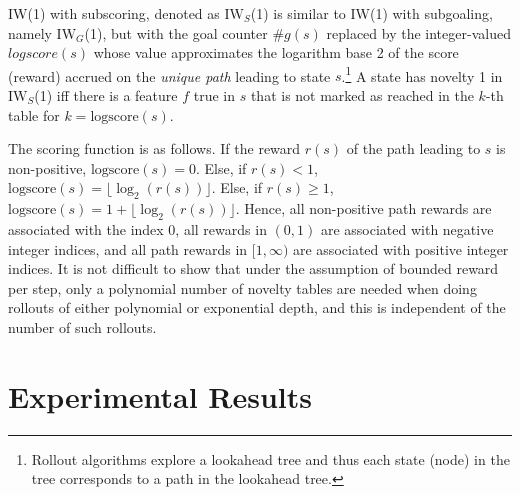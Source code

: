 \documentclass[letterpaper]{article}
\newcommand{\CHECK}[1]{\textcolor{red}{\bf *** #1 ***}}
\begin{document}
IW(1) with subscoring, denoted as $\textrm{IW}_S$(1) is similar to IW(1) with subgoaling,
namely $\textrm{IW}_G$(1), but with the goal counter $\#g(s)$ replaced by the integer-valued
$logscore(s)$ whose value approximates the logarithm base 2 of the score (reward) accrued
on the \emph{unique path} leading to state $s$.\footnote{Rollout algorithms explore a
  lookahead tree and thus each state (node) in the tree corresponds to a path
  in the lookahead tree.
}
A state has novelty 1 in $\textrm{IW}_S$(1) iff there is a feature $f$ true in $s$ that
is not marked as reached in the $k$-th table for $k=\text{logscore}(s)$.

The scoring function is as follows. If the reward $r(s)$ of the path leading 
to $s$ is non-positive, $\text{logscore}(s)=0$.
Else, if $r(s)<1$, $\text{logscore}(s)=\lfloor\log_2(r(s))\rfloor$.
Else, if $r(s)\geq 1$, $\text{logscore}(s)=1 + \lfloor\log_2(r(s))\rfloor$.
Hence, all non-positive path rewards are associated with the index 0, all
rewards in $(0,1)$ are associated with negative integer indices, and all
path rewards in $[1,\infty)$ are associated with positive integer indices.
It is not difficult to show that under the assumption of bounded reward per
step, only a polynomial number of novelty tables are needed when doing rollouts
of either polynomial or exponential depth, and this is independent of the number
of such rollouts.


\section{Experimental Results}
\end{document}
